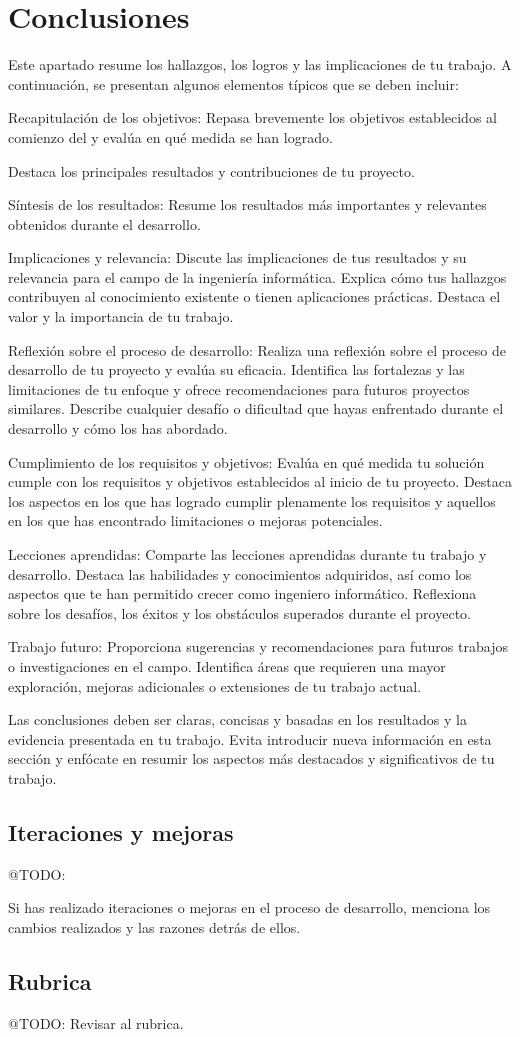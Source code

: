 \chapter{Conclusiones}\label{ch:chapter_5}


Este apartado resume los hallazgos, los logros y las implicaciones de tu trabajo.
A continuación, se presentan algunos elementos típicos que se deben incluir:

Recapitulación de los objetivos: Repasa brevemente los objetivos establecidos al comienzo del y evalúa en qué medida se
han logrado.

Destaca los principales resultados y contribuciones de tu proyecto.

Síntesis de los resultados: Resume los resultados más importantes y relevantes obtenidos durante el desarrollo.

Implicaciones y relevancia: Discute las implicaciones de tus resultados y su relevancia para el campo
de la ingeniería informática.
Explica cómo tus hallazgos contribuyen al conocimiento existente o tienen aplicaciones prácticas.
Destaca el valor y la importancia de tu trabajo.

Reflexión sobre el proceso de desarrollo: Realiza una reflexión sobre el proceso de desarrollo de tu proyecto y evalúa
su eficacia.
Identifica las fortalezas y las limitaciones de tu enfoque y ofrece recomendaciones para futuros proyectos similares.
Describe cualquier desafío o dificultad que hayas enfrentado durante el desarrollo y cómo los has abordado.

Cumplimiento de los requisitos y objetivos: Evalúa en qué medida tu solución cumple con los requisitos y objetivos
establecidos al inicio de tu proyecto.
Destaca los aspectos en los que has logrado cumplir plenamente los requisitos y aquellos en los que has encontrado
limitaciones o mejoras potenciales.

Lecciones aprendidas: Comparte las lecciones aprendidas durante tu trabajo y desarrollo.
Destaca las habilidades y conocimientos adquiridos, así como los aspectos que te han permitido crecer como ingeniero
informático.
Reflexiona sobre los desafíos, los éxitos y los obstáculos superados durante el proyecto.

Trabajo futuro: Proporciona sugerencias y recomendaciones para futuros trabajos o investigaciones en el campo.
Identifica áreas que requieren una mayor exploración, mejoras adicionales o extensiones de tu trabajo actual.

Las conclusiones deben ser claras, concisas y basadas en los resultados y la evidencia presentada en tu trabajo.
Evita introducir nueva información en esta sección y enfócate en
resumir los aspectos más destacados y significativos de tu trabajo.


\section{Iteraciones y mejoras}
 \colorbox{color_highlight}{@TODO:}

Si has realizado iteraciones o mejoras en el proceso de desarrollo, menciona los cambios realizados y las razones detrás
de ellos.


\section{Rubrica}
 \colorbox{color_highlight}{@TODO:}
Revisar al rubrica.

